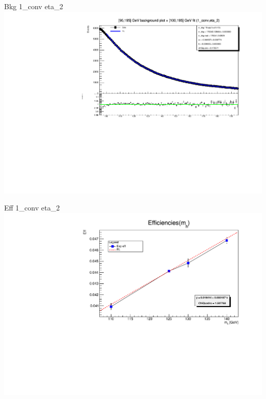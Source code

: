 \documentclass[10pt,UKenglish, leqno, xcolor = dvipsnames]{beamer}
\begin{document}
		\begin{frame}{Bkg 1\_conv eta\_2}
			\vfill
			\centering
			\includegraphics[width=1.\textwidth]{../images/week_10/bkg_100_195GeV_fit_1_conv_eta_2.pdf}
			\vfill
		\end{frame}
	
		\begin{frame}{Eff 1\_conv eta\_2}
			\vfill
			\includegraphics[width=1.\textwidth]{../images/week_10/efficiencies_fit_1_conv_eta_2.pdf}
			\vfill
		\end{frame}
	
\end{document}
